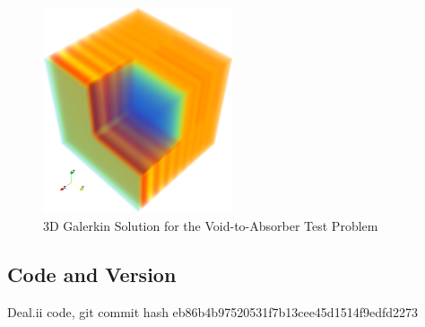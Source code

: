 \begin{figure}[h]
   \centering
   \includegraphics[width=0.5\textwidth]{void_to_absorber/Gal_3D.png}
   \caption{3D Galerkin Solution for the Void-to-Absorber Test Problem}
   \label{fig:void_to_absorber_3D}
\end{figure}
\subsection{Code and Version}
Deal.ii code, git commit hash eb86b4b97520531f7b13cee45d1514f9edfd2273
